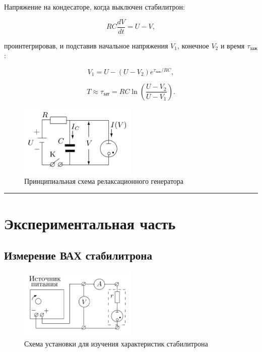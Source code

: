 \documentclass[a4paper,12pt]{article} %
\begin{document}
Напряжение на кондесаторе, когда выключен стабилитрон:

\[ RC \frac{dV}{dt} = U - V, \]

проинтегрировав, и подставив начальное напряжения $V_1$, конечное $V_2$ и время $\tau_\text{заж}$:

\[ V_1 = U - (U - V_2) e ^ {\tau_\text{заж}/RC}, \]

\[T \approx \tau_\text{зат} = RC \ln \left( \frac{U - V_2}{U - V_1} \right).\]

\begin{figure}
\begin{center}
\includegraphics[width=0.5\textwidth]{scheme1.png}
\caption{Принципиальная схема релаксационного генератора}
\label{fig:sc1}
\end{center}
\end{figure}


\medskip\hrule\medskip

\section{Экспериментальная часть}

\subsection{Измерение ВАХ стабилитрона}

\begin{figure}
\begin{center}
\includegraphics[width=0.5\textwidth]{scheme2.png}
\caption{Схема установки для изучения характеристик стабилитрона}
\label{fig:sc2}
\end{center}
\end{figure}
\end{document}

